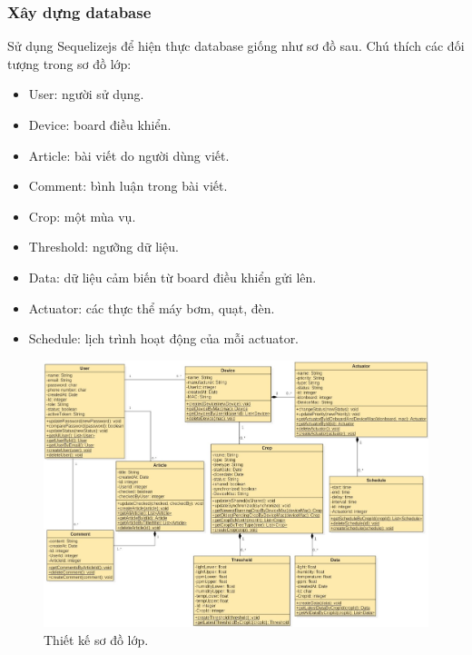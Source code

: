 \documentclass[a4paper,12pt,oneside]{article}
\begin{document}
\subsubsection{Xây dựng database}
\noindent Sử dụng Sequelizejs để hiện thực database giống như sơ đồ sau.
Chú thích các đối tượng trong sơ đồ lớp:
\begin{itemize}
\item User: người sử dụng.
\item Device: board điều khiển.
\item Article: bài viết do người dùng viết.
\item Comment: bình luận trong bài viết.
\item Crop: một mùa vụ.
\item Threshold: ngưỡng dữ liệu.
\item Data: dữ liệu cảm biến từ board điều khiển gửi lên.
\item Actuator: các thực thể máy bơm, quạt, đèn.
\item Schedule: lịch trình hoạt động của mỗi actuator.
\end{itemize}
\begin{landscape}
\begin{figure}[b]
\centering
\includegraphics[scale=0.64]{hinh/class_diagram.jpg}
\caption{Thiết kế sơ đồ lớp.}
\end{figure}
\end{landscape}
\end{document}
